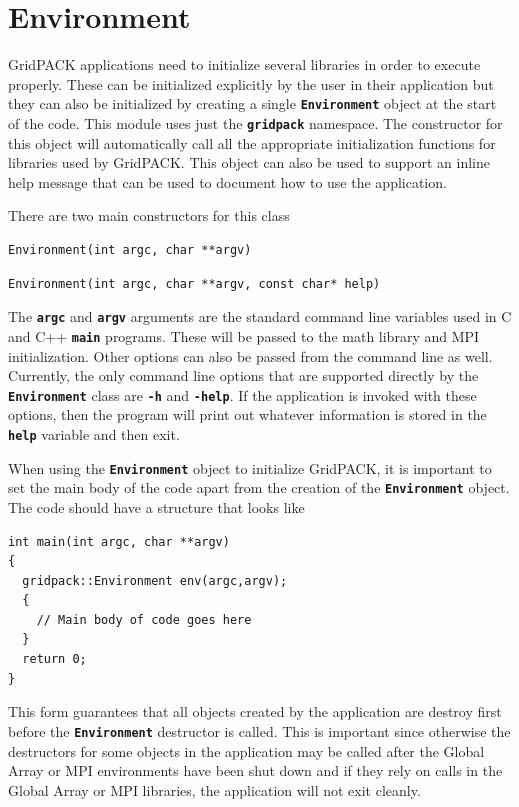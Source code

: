 \section{Environment}\label{environment}

GridPACK applications need to initialize several libraries in order to execute
properly. These can be initialized explicitly by the user in their
application but they can also be initialized by creating a single
\texttt{\textbf{Environment}} object at the start of the code. This module uses
just the \texttt{\textbf{gridpack}} namespace. The constructor
for this object will automatically call all the appropriate initialization
functions for libraries used by GridPACK. This object can also be used to
support an inline help message that can be used to document how to use the
application.

There are two main constructors for this class

{
\color{red}
\begin{Verbatim}[fontseries=b]
Environment(int argc, char **argv)
\end{Verbatim}
}

{
\color{red}
\begin{Verbatim}[fontseries=b]
Environment(int argc, char **argv, const char* help)
\end{Verbatim}
}

The \texttt{\textbf{argc}} and \texttt{\textbf{argv}} arguments are the standard
command line variables used in C and C++ \texttt{\textbf{main}} programs. These
will be passed to the math library and MPI initialization. Other options can also be
passed from the command line as well. Currently, the only command line
options that are supported directly by the \texttt{\textbf{Environment}} class
are \texttt{\textbf{-h}} and \texttt{\textbf{-help}}. If the application is invoked
with these options, then the program will print out whatever information is stored
in the \texttt{\textbf{help}} variable and then exit.

When using the \texttt{\textbf{Environment}} object to initialize GridPACK, it
is important to set the main body of the code apart from the creation of the
\texttt{\textbf{Environment}} object. The code should have a structure that
looks like

{
\color{red}
\begin{Verbatim}[fontseries=b]
int main(int argc, char **argv)
{
  gridpack::Environment env(argc,argv);
  {
    // Main body of code goes here
  }
  return 0;
}
\end{Verbatim}
}

This form guarantees that all objects created by the application are destroy
first before the \texttt{\textbf{Environment}} destructor is called. This is
important since otherwise the destructors for some objects in the application
may be called after the Global Array or MPI environments have been shut down and
if they rely on calls in the Global Array or MPI libraries, the application will
not exit cleanly.
\newline
\hyperlink{topDoc}{\color{blue}{Top}}
